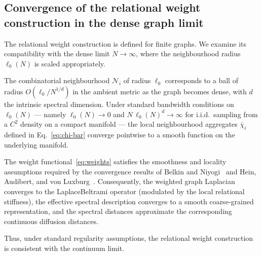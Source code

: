 \subsection{Convergence of the relational weight construction in the dense graph limit}
  \label{subsec:convergence_dense}

  The relational weight construction is defined for finite graphs.
  We examine its compatibility with the dense limit $N\to\infty$, where the neighbourhood
  radius $\ell_0(N)$ is scaled appropriately.

  The combinatorial neighbourhood $\mathcal{N}_i$ of radius $\ell_0$
  corresponds to a ball of radius $O(\ell_0/N^{1/d})$ in the ambient
  metric as the graph becomes dense, with $d$ the intrinsic spectral
  dimension.
  Under standard bandwidth conditions on $\ell_0(N)$ --- namely
  $\ell_0(N)\to 0$ and $N\,\ell_0(N)^d \to \infty$ for i.i.d.\ sampling
  from a $C^2$ density on a compact manifold --- the local neighbourhood
  aggregates $\bar{\chi}_i$ defined in Eq.~\eqref{eq:chi-bar} converge
  pointwise to a smooth function on the underlying manifold.

  The weight functional~\eqref{eq:weights} satisfies the smoothness and
  locality assumptions required by the convergence results of
  Belkin and Niyogi~\cite{Belkin2003} and Hein, Audibert, and von
  Luxburg~\cite{Hein2007}.
  Consequently, the weighted graph Laplacian converges to the
  Laplace\textendash Beltrami operator (modulated by the local relational
  stiffness), the effective spectral description converges to a smooth
  coarse-grained representation, and the spectral distances approximate
  the corresponding continuous diffusion distances.

  Thus, under standard regularity assumptions, the relational weight
  construction is consistent with the continuum limit.
